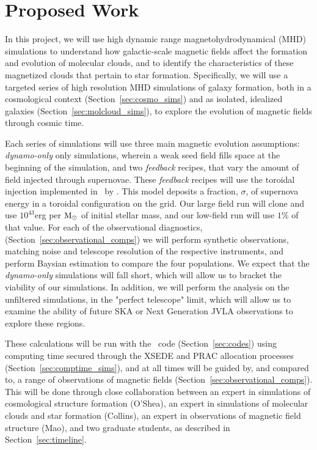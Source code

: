 \vspace{-4mm}
\section{Proposed Work}
\vspace{-3mm}

In this project, we will use high dynamic range magnetohydrodynamical
(MHD) simulations to understand how galactic-scale magnetic fields
affect the formation and evolution of molecular clouds, and to
identify the characteristics of these magnetized clouds that pertain
to star formation.  Specifically, we will use a targeted series of
high resolution MHD simulations of galaxy formation, both in a
cosmological context (Section~\ref{sec:cosmo_sims}) and as isolated, idealized
galaxies (Section~\ref{sec:molcloud_sims}), to explore the evolution
of magnetic fields through cosmic time.  

Each series of simulations will use
three main magnetic evolution assumptions: \emph{dynamo-only} only simulations,
wherein a weak seed field fills space at the beginning of the simulation, and
two \emph{feedback} recipes, that vary the amount of field injected through
supernovae.  These \emph{feedback} recipes will use the toroidal injection
implemented in \enzo\ by \citet{Butsky17}.  This model deposits a fraction,
$\sigma$, of supernova energy in a toroidal configuration on the grid.  Our
large field run will clone \citep{Butsky17} and use
 $10^{43}$erg per $\rm{M}_\odot$ of initial
stellar mass, and our low-field run will use $1\%$ of that value.  For each of
the observational diagnostics,
(Section~\ref{sec:observational_comps}) we will perform synthetic observations,
matching noise and telescope resolution of the respective instruments, and
perform Baysian estimation to compare the four populations.  We expect that the
\emph{dynamo-only} simulations will fall short, which will allow us to bracket
the viability of our simulations.  In addition, we will perform the analysis on
the unfiltered simulations, in the "perfect telescope" limit, which will allow
us to examine the ability of future SKA or Next Generation JVLA observations to
explore these regions.

These calculations will be run with the \enzo\ code
(Section~\ref{sec:codes}) using computing time secured through the
XSEDE and PRAC allocation processes (Section~\ref{sec:comptime_sims}), and at all
times will be guided by, and compared to, a range of observations of
magnetic fields (Section~\ref{sec:observational_comps}).  This will be
done through close collaboration between an expert in simulations of
cosmological structure formation (O'Shea), an expert in simulations of
molecular clouds and star formation (Collins), an expert in
observations of magnetic field structure (Mao), and two graduate
students, as described in Section~\ref{sec:timeline}.



